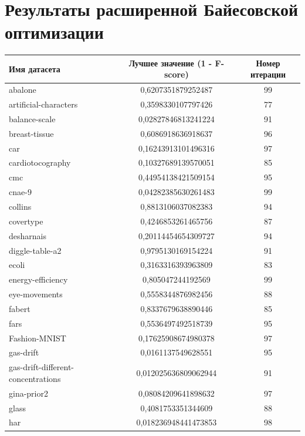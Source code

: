 \documentclass[times,specification,annotation]{itmo-student-thesis}
\begin{document}
\chapter{Результаты расширенной Байесовской оптимизации}\label{app:pbo-results}
\begin{center} 
	\begin{longtable}{ |m{5cm}|c|c| } 
		\hline
		\textbf{Имя датасета} & \textbf{Лучшее значение (1 - F-score)} & \textbf{Номер итерации} \\
		\hline\hline
		abalone & 0,6207351879252487 & 99 \\
		\hline
		artificial-characters & 0,3598330107797426 & 77 \\
		\hline
		balance-scale & 0,02827846813241224 & 91 \\
		\hline
		breast-tissue & 0,6086918636918637 & 96 \\
		\hline
		car & 0,16243913101496316 & 97 \\
		\hline
		cardiotocography & 0,10327689139570051 & 85 \\
		\hline
		cmc & 0,44954138421509154 & 95 \\
		\hline
		cnae-9 & 0,04282385630261483 & 99 \\
		\hline
		collins & 0,8813106037082383 & 94 \\
		\hline
		covertype & 0,4246853261465756 & 87 \\
		\hline
		desharnais & 0,20114454654309727 & 94 \\
		\hline
		diggle-table-a2 & 0,9795130169154224 & 91 \\
		\hline
		ecoli & 0,3163316393963809 & 83 \\
		\hline
		energy-efficiency & 0,805047244192569 & 99 \\
		\hline
		eye-movements & 0,5558344876982456 & 88 \\
		\hline
		fabert & 0,8337679638890446 & 85 \\
		\hline
		fars & 0,5536497492518739 & 95 \\
		\hline
		Fashion-MNIST & 0,17625908674980378 & 97 \\
		\hline
		gas-drift & 0,0161137549628551 & 95 \\
		\hline
		gas-drift-different-concentrations & 0,012025636809062944 & 91 \\
		\hline
		gina-prior2 & 0,08084209641898632 & 97 \\
		\hline
		glass & 0,4081753351344609 & 88 \\
		\hline
		har & 0,018236948441473853 & 98 \\

\end{longtable}
\end{center}
\end{document}
